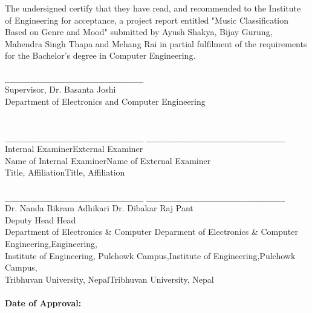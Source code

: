 	\newpage
	
    \vspace*{6\baselineskip}
    \noindent The undersigned certify that they have read, and recommended to the Institute of Engineering for acceptance, a project report entitled "Music Classification Based on Genre and Mood" submitted by Ayush Shakya, Bijay Gurung, Mahendra Singh Thapa and Mehang Rai in partial fulfilment of the requirements for the Bachelor’s degree in Computer Engineering. \\\\
    \noindent
    \verb|________________________________|\\
    Supervisor, Dr. Basanta Joshi\\
    Department of Electronics and Computer Engineering\\\\
    \\
    \verb|________________________________| \hspace{10mm}\verb|________________________________|\\
    Internal Examiner\hspace{50mm}External Examiner\\
    Name of Internal Examiner\hspace{34mm}Name of External Examiner\\
    Title, Affiliation\hspace{53mm}Title, Affiliation\\ 
    \\
    \verb|________________________________| \hspace{10mm}\verb|________________________________|\\
    Dr. Nanda Bikram Adhikari \hspace{33mm}Dr. Dibakar Raj Pant\\
    Deputy Head \hspace{58mm}Head \\
    Department of Electronics \& Computer \hspace{13mm} Deparment of Electronics \& Computer\\ 
    Engineering,\hspace{60mm}Engineering,\\
    Institute of Engineering, Pulchowk Campus,\hspace{6mm}Institute of Engineering,Pulchowk Campus,\\
    Tribhuvan University, Nepal\hspace{33mm}Tribhuvan University, Nepal\\\\

    
    \noindent \textbf{Date of Approval:}

